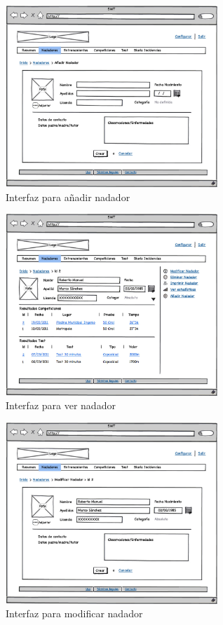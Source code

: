   	\begin{figure}[H]
  	  \centering
  	    \includegraphics[width=8cm]{./eps/p_interfaz/11_Nadadores_new.eps}
  	  \caption{Interfaz para añadir nadador}
  	  \label{fig:interfaz_nadadores_new}
  	\end{figure}

  	\begin{figure}[H]
  	  \centering
  	    \includegraphics[width=8cm]{./eps/p_interfaz/12_Nadadores_show.eps}
  	  \caption{Interfaz para ver nadador}
  	  \label{fig:interfaz_nadadores_show}
  	\end{figure}

  	\begin{figure}[H]
  	  \centering
  	    \includegraphics[width=8cm]{./eps/p_interfaz/13_Nadadores_modif.eps}
  	  \caption{Interfaz para modificar nadador}
  	  \label{fig:interfaz_nadadores_modif}
  	\end{figure}

